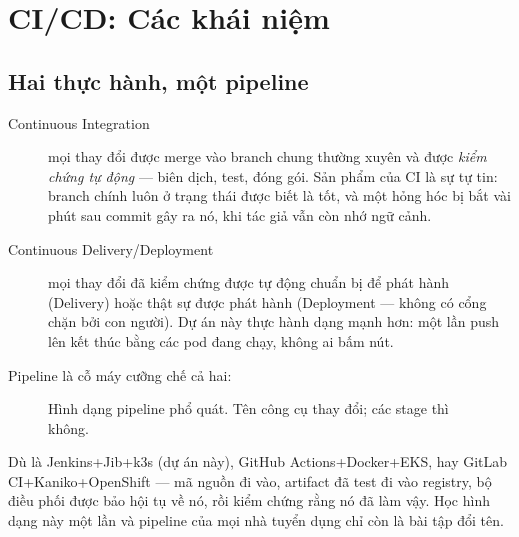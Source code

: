 \chapter{CI/CD: Các khái niệm}
\label{ch:cicd}

\section{Hai thực hành, một pipeline}

\begin{description}
  \item[Continuous Integration] mọi thay đổi được merge vào branch
  chung thường xuyên và được \emph{kiểm chứng tự động} --- biên dịch,
  test, đóng gói. Sản phẩm của CI là sự tự tin: branch chính luôn ở
  trạng thái được biết là tốt, và một hỏng hóc bị bắt vài phút sau
  commit gây ra nó, khi tác giả vẫn còn nhớ ngữ cảnh.
  \item[Continuous Delivery/Deployment] mọi thay đổi đã kiểm chứng
  được tự động chuẩn bị để phát hành (Delivery) hoặc thật sự được
  phát hành (Deployment --- không có cổng chặn bởi con người). Dự án
  này thực hành dạng mạnh hơn: một lần push lên  kết thúc
  bằng các pod đang chạy, không ai bấm nút.
\end{description}

Pipeline là cỗ máy cưỡng chế cả hai:

\begin{figure}[h]
\centering
{}
\caption{Hình dạng pipeline phổ quát. Tên công cụ thay đổi; các stage thì không.}
\end{figure}

Dù là Jenkins+Jib+k3s (dự án này), GitHub Actions+Docker+EKS, hay
GitLab CI+Kaniko+OpenShift --- mã nguồn đi vào, artifact đã test đi
vào registry, bộ điều phối được bảo hội tụ về nó, rồi kiểm chứng rằng
nó đã làm vậy. Học hình dạng này một lần và pipeline của mọi nhà tuyển
dụng chỉ còn là bài tập đổi tên.


